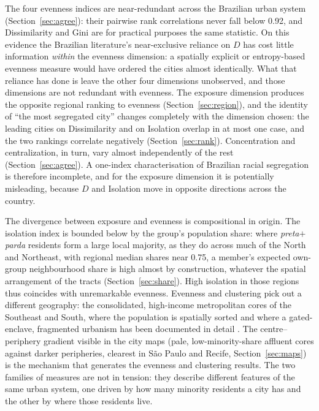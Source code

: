 \documentclass[12pt,a4paper]{article}
\begin{document}
The four evenness indices are near-redundant across the Brazilian urban system (Section~\ref{sec:agree}): their pairwise rank correlations never fall below 0.92, and Dissimilarity and Gini are for practical purposes the same statistic. On this evidence the Brazilian literature's near-exclusive reliance on $D$ has cost little information \emph{within} the evenness dimension: a spatially explicit or entropy-based evenness measure would have ordered the cities almost identically. What that reliance has done is leave the other four dimensions unobserved, and those dimensions are not redundant with evenness. The exposure dimension produces the opposite regional ranking to evenness (Section~\ref{sec:region}), and the identity of ``the most segregated city'' changes completely with the dimension chosen: the leading cities on Dissimilarity and on Isolation overlap in at most one case, and the two rankings correlate negatively (Section~\ref{sec:rank}). Concentration and centralization, in turn, vary almost independently of the rest (Section~\ref{sec:agree}). A one-index characterisation of Brazilian racial segregation is therefore incomplete, and for the exposure dimension it is potentially misleading, because $D$ and Isolation move in opposite directions across the country.

The divergence between exposure and evenness is compositional in origin. The isolation index is bounded below by the group's population share: where \emph{preta}$+$\emph{parda} residents form a large local majority, as they do across much of the North and Northeast, with regional median shares near 0.75, a member's expected own-group neighbourhood share is high almost by construction, whatever the spatial arrangement of the tracts (Section~\ref{sec:share}). High isolation in those regions thus coincides with unremarkable evenness. Evenness and clustering pick out a different geography: the consolidated, high-income metropolitan cores of the Southeast and South, where the population is spatially sorted and where a gated-enclave, fragmented urbanism has been documented in detail \citep{barros2024saopaulolondres, danilofranca2022fortaleza, telles2004race}. The centre--periphery gradient visible in the city maps (pale, low-minority-share affluent cores against darker peripheries, clearest in S\~ao Paulo and Recife, Section~\ref{sec:maps}) is the mechanism that generates the evenness and clustering results. The two families of measures are not in tension: they describe different features of the same urban system, one driven by how many minority residents a city has and the other by where those residents live.
\end{document}
